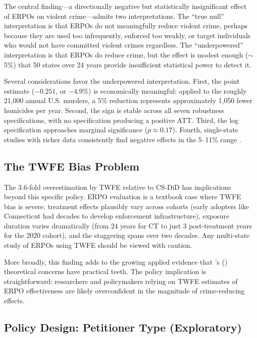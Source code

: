 \documentclass[12pt]{article}
\begin{document}
The central finding---a directionally negative but statistically insignificant effect of ERPOs on violent crime---admits two interpretations. The ``true null'' interpretation is that ERPOs do not meaningfully reduce violent crime, perhaps because they are used too infrequently, enforced too weakly, or target individuals who would not have committed violent crimes regardless. The ``underpowered'' interpretation is that ERPOs do reduce crime, but the effect is modest enough ($\sim$5\%) that 50 states over 24 years provide insufficient statistical power to detect it.

Several considerations favor the underpowered interpretation. First, the point estimate ($-0.251$, or $-4.9\%$) is economically meaningful: applied to the roughly 21,000 annual U.S. murders, a 5\% reduction represents approximately 1,050 fewer homicides per year. Second, the sign is stable across all seven robustness specifications, with no specification producing a positive ATT. Third, the log specification approaches marginal significance ($p \approx 0.17$). Fourth, single-state studies with richer data consistently find negative effects in the 5--11\% range \citep{florida_erpo2024, heflin2023red}.

\subsection{The TWFE Bias Problem}

The 3.6-fold overestimation by TWFE relative to CS-DiD has implications beyond this specific policy. ERPO evaluation is a textbook case where TWFE bias is severe: treatment effects plausibly vary across cohorts (early adopters like Connecticut had decades to develop enforcement infrastructure), exposure duration varies dramatically (from 24 years for CT to just 3 post-treatment years for the 2020 cohort), and the staggering spans over two decades. Any multi-state study of ERPOs using TWFE should be viewed with caution.

More broadly, this finding adds to the growing applied evidence that \citeauthor{goodman2021difference}'s (\citeyear{goodman2021difference}) theoretical concerns have practical teeth. The policy implication is straightforward: researchers and policymakers relying on TWFE estimates of ERPO effectiveness are likely overconfident in the magnitude of crime-reducing effects.

\subsection{Policy Design: Petitioner Type (Exploratory)}
\end{document}
